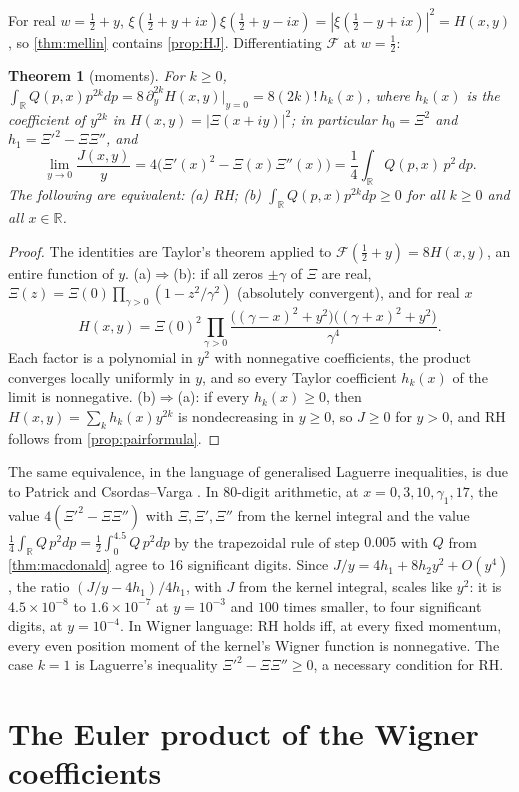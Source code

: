 \documentclass[11pt]{article}
\newtheorem{theorem}{Theorem}[section]
\theoremstyle{definition}\newtheorem{definition}[theorem]{Definition}
\theoremstyle{remark}\newtheorem{remark}[theorem]{Remark}
\newcommand{\R}{\mathbb R}\newcommand{\C}{\mathbb C}\newcommand{\N}{\mathbb N}
\begin{document}
For real $w=\frac12+y$, $\xi(\frac12+y+ix)\xi(\frac12+y-ix)=|\xi(\frac12-y+ix)|^2=H(x,y)$, so \cref{thm:mellin} contains \cref{prop:HJ}. Differentiating $\mathcal F$ at $w=\frac12$:

\begin{theorem}[moments]\label{thm:moments}
For $k\ge0$, $\int_\R Q(p,x)p^{2k}dp=8\,\partial_y^{2k}H(x,y)\big|_{y=0}=8(2k)!\,h_k(x)$, where $h_k(x)$ is the coefficient of $y^{2k}$ in $H(x,y)=|\Xi(x+iy)|^2$; in particular $h_0=\Xi^2$ and $h_1=\Xi'^2-\Xi\Xi''$, and
\[
\lim_{y\to0}\frac{J(x,y)}{y}=4\bigl(\Xi'(x)^2-\Xi(x)\Xi''(x)\bigr)=\frac14\int_\R Q(p,x)\,p^2\,dp .
\]
The following are equivalent: (a) RH; (b) $\int_\R Q(p,x)p^{2k}dp\ge0$ for all $k\ge0$ and all $x\in\R$.
\end{theorem}
\begin{proof}
The identities are Taylor's theorem applied to $\mathcal F(\frac12+y)=8H(x,y)$, an entire function of $y$. (a)$\Rightarrow$(b): if all zeros $\pm\gamma$ of $\Xi$ are real, $\Xi(z)=\Xi(0)\prod_{\gamma>0}(1-z^2/\gamma^2)$ (absolutely convergent), and for real $x$
\[
H(x,y)=\Xi(0)^2\prod_{\gamma>0}\frac{\bigl((\gamma-x)^2+y^2\bigr)\bigl((\gamma+x)^2+y^2\bigr)}{\gamma^4}.
\]
Each factor is a polynomial in $y^2$ with nonnegative coefficients, the product converges locally uniformly in $y$, and so every Taylor coefficient $h_k(x)$ of the limit is nonnegative. (b)$\Rightarrow$(a): if every $h_k(x)\ge0$, then $H(x,y)=\sum_kh_k(x)y^{2k}$ is nondecreasing in $y\ge0$, so $J\ge0$ for $y>0$, and RH follows from \cref{prop:pairformula}.
\end{proof}
The same equivalence, in the language of generalised Laguerre inequalities, is due to Patrick \cite{Patrick} and Csordas--Varga \cite[Thm.~2.9]{CV}. In 80-digit arithmetic, at $x=0,3,10,\gamma_1,17$, the value $4(\Xi'^2-\Xi\Xi'')$ with $\Xi,\Xi',\Xi''$ from the kernel integral and the value $\frac14\int_\R Q\,p^2dp=\frac12\int_0^{4.5}Q\,p^2dp$ by the trapezoidal rule of step $0.005$ with $Q$ from \cref{thm:macdonald} agree to 16 significant digits. Since $J/y=4h_1+8h_2y^2+O(y^4)$, the ratio $(J/y-4h_1)/4h_1$, with $J$ from the kernel integral, scales like $y^2$: it is $4.5\times10^{-8}$ to $1.6\times10^{-7}$ at $y=10^{-3}$ and $100$ times smaller, to four significant digits, at $y=10^{-4}$. In Wigner language: RH holds iff, at every fixed momentum, every even position moment of the kernel's Wigner function is nonnegative. The case $k=1$ is Laguerre's inequality $\Xi'^2-\Xi\Xi''\ge0$, a necessary condition for RH.

\section{The Euler product of the Wigner coefficients}\label{sec:euler}
\end{document}
